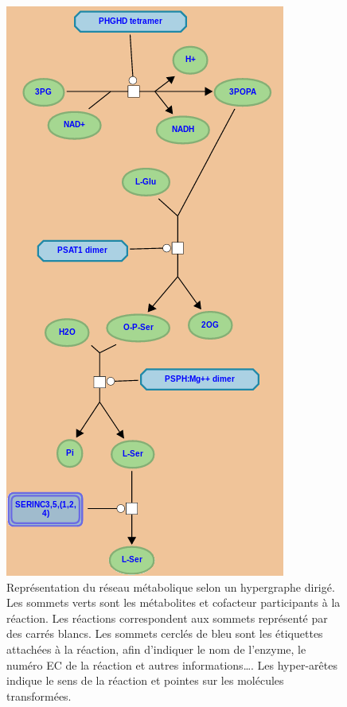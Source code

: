 \begin{refsegment}
\begin{shadedfigure}[H]
\begin{subfigure}[t]{.45\textwidth}
        \includegraphics[width=\textwidth]{img/reactome_homo_sapiens_serine_biosynthesis.png}
        \caption{ Représentation du réseau métabolique selon un hypergraphe dirigé. Les sommets verts sont les métabolites et cofacteur participants à la réaction. Les réactions correspondent aux sommets représenté par des carrés blancs. Les sommets cerclés de bleu sont les étiquettes attachées à la réaction, afin d'indiquer le nom de l'enzyme, le numéro \acrfull{EC} de la réaction et autres informations\ldots. Les hyper-arêtes indique le sens de la réaction et pointes sur les molécules transformées. }
        \label{fig:reactome_serine}
    \end{subfigure}
    \end{shadedfigure}


\end{refsegment}

